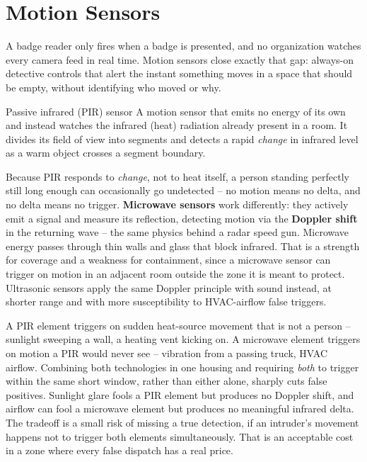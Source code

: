 \section{Motion Sensors}

A badge reader only fires when a badge is presented, and no organization watches every camera feed
in real time. Motion sensors close exactly that gap: always-on detective controls that alert the
instant something moves in a space that should be empty, without identifying who moved or why.

\begin{definition}{Passive infrared (PIR) sensor}
A motion sensor that emits no energy of its own and instead watches the infrared (heat) radiation
already present in a room. It divides its field of view into segments and detects a rapid
\emph{change} in infrared level as a warm object crosses a segment boundary.
\end{definition}

Because PIR responds to \emph{change}, not to heat itself, a person standing perfectly still long
enough can occasionally go undetected -- no motion means no delta, and no delta means no trigger.
\textbf{Microwave sensors} work differently: they actively emit a signal and measure its
reflection, detecting motion via the \textbf{Doppler shift} in the returning wave -- the same
physics behind a radar speed gun. Microwave energy passes through thin walls and glass that block
infrared. That is a strength for coverage and a weakness for containment, since a microwave sensor can
trigger on motion in an adjacent room outside the zone it is meant to protect. Ultrasonic sensors
apply the same Doppler principle with sound instead, at shorter range and with more susceptibility
to HVAC-airflow false triggers.

\begin{example}
A PIR element triggers on sudden heat-source movement that is not a person -- sunlight sweeping a
wall, a heating vent kicking on. A microwave element triggers on motion a PIR would never see --
vibration from a passing truck, HVAC airflow. Combining both technologies in one housing and
requiring \emph{both} to trigger within the same short window, rather than either alone, sharply
cuts false positives. Sunlight glare fools a PIR element but produces no Doppler shift, and
airflow can fool a microwave element but produces no meaningful infrared delta. The tradeoff is a
small risk of missing a true detection, if an intruder's movement happens not to trigger both
elements simultaneously. That is an acceptable cost in a zone where every false dispatch has a real
price.
\end{example}

